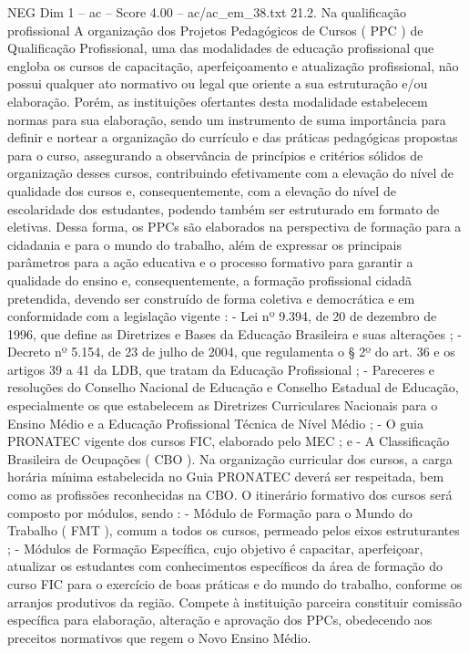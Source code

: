 \begin{textsample}{NEG Dim 1 – ac – Score 4.00 – ac/ac\_em\_38.txt}  \label{ex:f1_neg_116}
21.2.
Na qualificação profissional A organização dos Projetos Pedagógicos de Cursos ( PPC ) de Qualificação Profissional, uma das modalidades de educação profissional que engloba os cursos de capacitação, aperfeiçoamento e atualização profissional, não possui qualquer ato normativo ou legal que oriente a sua estruturação e/ou elaboração.
Porém, as instituições ofertantes desta modalidade estabelecem normas para sua elaboração, sendo um instrumento de suma importância para definir e nortear a organização do currículo e das práticas pedagógicas propostas para o curso, assegurando a observância de princípios e critérios sólidos de organização desses cursos, contribuindo efetivamente com a elevação do nível de qualidade dos cursos e, consequentemente, com a elevação do nível de escolaridade dos estudantes, podendo também ser estruturado em formato de eletivas.
Dessa forma, os PPCs são elaborados na perspectiva de formação para a cidadania e para o mundo do trabalho, além de expressar os principais parâmetros para a ação educativa e o processo formativo para garantir a qualidade do ensino e, consequentemente, a formação profissional cidadã pretendida, devendo ser construído de forma coletiva e democrática e em conformidade com a legislação vigente : - Lei nº 9.394, de 20 de dezembro de 1996, que define as Diretrizes e Bases da Educação Brasileira e suas alterações ; - Decreto nº 5.154, de 23 de julho de 2004, que regulamenta o § 2º do art. 36 e os artigos 39 a 41 da LDB, que tratam da Educação Profissional ; - Pareceres e resoluções do Conselho Nacional de Educação e Conselho Estadual de Educação, especialmente os que estabelecem as Diretrizes Curriculares Nacionais para o Ensino Médio e a Educação Profissional Técnica de Nível Médio ; - O guia PRONATEC vigente dos cursos FIC, elaborado pelo MEC ; e - A Classificação Brasileira de Ocupações ( CBO ).
Na organização curricular dos cursos, a carga horária mínima estabelecida no Guia PRONATEC deverá ser respeitada, bem como as profissões reconhecidas na CBO.
O itinerário formativo dos cursos será composto por módulos, sendo : - Módulo de Formação para o Mundo do Trabalho ( FMT ), comum a todos os cursos, permeado pelos eixos estruturantes ; - Módulos de Formação Específica, cujo objetivo é capacitar, aperfeiçoar, atualizar os estudantes com conhecimentos específicos da área de formação do curso FIC para o exercício de boas práticas e do mundo do trabalho, conforme os arranjos produtivos da região.
Compete à instituição parceira constituir comissão específica para elaboração, alteração e aprovação dos PPCs, obedecendo aos preceitos normativos que regem o Novo Ensino Médio.

\end{textsample}
